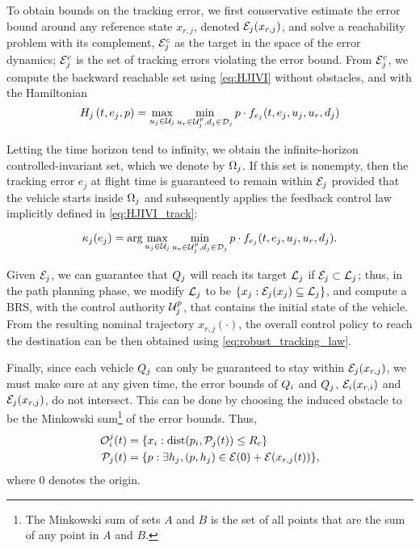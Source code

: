 To obtain bounds on the tracking error, we first conservative estimate the error bound around any reference state $x_{r,j}$, denoted $\mathcal{E}_j(x_{r,j})$, and solve a reachability problem with its complement, $\mathcal{E}_j^c$ as the target in the space of the error dynamics; $\mathcal{E}_j^c$ is the set of tracking errors violating the error bound. From $\mathcal{E}_j^c$, we compute the backward reachable set using \eqref{eq:HJIVI} without obstacles, and with the Hamiltonian
\vspace{-0.5em}
\begin{equation}
\label{eq:HJIVI_track}
H_j\left(t, e_j, p\right) = \max_{u_j \in \cset_j} \min_{u_r \in\cset^p_j, d_j \in \dset_j} p \cdot f_{e_j}(t, e_j, u_j, u_r,d_j)
\end{equation}

Letting the time horizon tend to infinity, we obtain the infinite-horizon controlled-invariant set, which we denote by $\Omega_j$. If this set is nonempty, then the tracking error $e_j$ at flight time is guaranteed to remain within $\mathcal{E}_j$ provided that the vehicle starts inside $\Omega_j$ and subsequently applies the feedback control law implicitly defined in \eqref{eq:HJIVI_track}:

\begin{equation}
\label{eq:robust_tracking_law}
\tracklaw_j(e_j) = \arg\max_{u_j \in \cset_j} \min_{u_r \in\cset^p_j, d_j \in \dset_j} p \cdot f_{e_j}(t,e_j,u_j,u_r,d_j).
\end{equation}

Given $\mathcal{E}_j$, we can guarantee that $Q_{j}$ will reach its target $\mathcal{L}_j$ if $\mathcal{E}_j \subset \mathcal{L}_j$; thus, in the path planning phase, we modify $\mathcal{L}_j$ to be $\{x_j: \mathcal{E}_j(x_j) \subseteq \mathcal{L}_j\}$, and compute a BRS, with the control authority $\mathcal{U}^p_j$, that contains the initial state of the vehicle. From the resulting nominal trajectory $x_{r,j}(\cdot)$, the overall control policy to reach the destination can be then obtained using \eqref{eq:robust_tracking_law}.

Finally, since each vehicle $Q_{j}$ can only be guaranteed to stay within $\mathcal{E}_j(x_{r,j})$, we must make sure at any given time, the error bounds of $Q_{i}$ and $Q_{j}$, $\mathcal{E}_i(x_{r,i})$ and $\mathcal{E}_j(x_{r,j})$, do not intersect. This can be done by choosing the induced obstacle to be the Minkowski sum\footnote{The Minkowski sum of sets $A$ and $B$ is the set of all points that are the sum of any point in $A$ and $B$.} of the error bounds. Thus,
\vspace{-0.3em}
\begin{equation}
\begin{aligned}
\mathcal{O}_i^j(t) &= \{x_i: \text{dist}(p_i, \mathcal{P}_j(t)) \le R_c \} \\
\mathcal{P}_j(t) &= \{p: \exists h_j, (p, h_j) \in \mathcal{E}(0) + \mathcal{E}(x_{r,j}(t)) \},
\end{aligned}
\end{equation}
\noindent where $0$ denotes the origin. 
